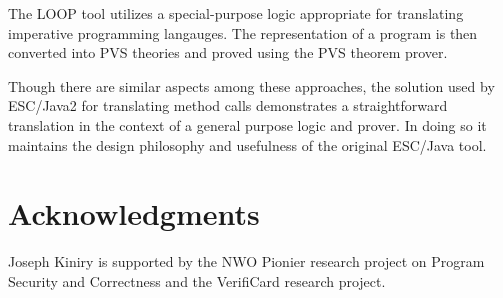 \documentclass{sig-alternate}
\begin{document}
The LOOP tool utilizes a special-purpose logic appropriate for translating imperative programming
langauges.  The representation of a program is then converted into PVS theories and proved
using the PVS theorem prover.

Though there are similar aspects among these approaches, the solution used by ESC/Java2
for translating method calls demonstrates a straightforward translation in the context of 
a general purpose logic and prover.  In doing so it maintains the design philosophy and usefulness
of the original ESC/Java tool.

\section{Acknowledgments}

Joseph Kiniry is supported by the NWO Pionier research
project on Program Security and Correctness and the VerifiCard
research project. 


%

%

  


%
%



\end{document}
